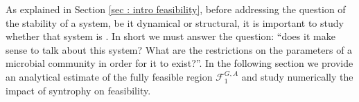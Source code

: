 \documentclass[12pt, titlepage]{report}
\begin{document}
As explained in Section \ref{sec : intro feasibility}, before addressing the question of the stability of a system, be it dynamical or structural, it is important to study whether that system is . In short we must answer the question: ``does it make sense to talk about this system? What are the restrictions on the parameters of a microbial community in order for it to exist?''.
 In the following section we provide an analytical estimate of the fully feasible region $\mathcal{F}^{G,A}_1$ and study numerically the impact of syntrophy on feasibility.
\end{document}
